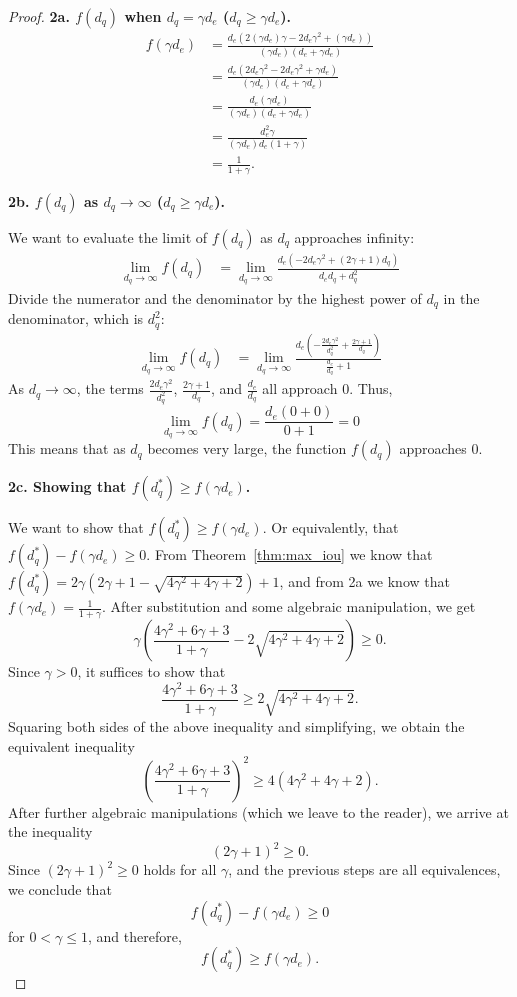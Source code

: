 \begin{proof}
\textbf{2a. $f(d_q)$ when $d_q = \gamma d_e$ ($d_q \ge \gamma d_e$).}
\begin{align*}
    f(\gamma d_e) &= \frac{d_{e} \left( 2 (\gamma d_e) \gamma - 2 d_{e} \gamma^{2} + (\gamma d_e)\right)}{(\gamma d_e) \left(d_{e} + \gamma d_e\right)} \\
    &= \frac{d_{e} \left( 2 d_e \gamma^2 - 2 d_{e} \gamma^{2} + \gamma d_e\right)}{(\gamma d_e) \left(d_{e} + \gamma d_e\right)} \\
    &= \frac{d_{e} \left(\gamma d_e\right)}{(\gamma d_e) \left(d_{e} + \gamma d_e\right)} \\
    &= \frac{d_{e}^2 \gamma}{(\gamma d_e) d_{e}(1+\gamma)} \\
    &= \frac{1}{1+\gamma}.
\end{align*}

\textbf{2b. $f(d_q)$ as $d_q \rightarrow \infty$ ($d_q \ge \gamma d_e$).}

We want to evaluate the limit of $f(d_q)$ as $d_q$ approaches infinity:
\begin{align*}
\lim_{d_q \rightarrow \infty} f(d_q) &= \lim_{d_q \rightarrow \infty} \frac{d_e (-2d_e \gamma^2 + (2\gamma + 1)d_q)}{d_e d_q + d_q^2}
\end{align*}
Divide the numerator and the denominator by the highest power of $d_q$ in the denominator, which is $d_q^2$:
\begin{align*}
\lim_{d_q \rightarrow \infty} f(d_q) &= \lim_{d_q \rightarrow \infty} \frac{d_e \left(-\frac{2d_e \gamma^2}{d_q^2} + \frac{2\gamma + 1}{d_q}\right)}{\frac{d_e}{d_q} + 1}
\end{align*}
As $d_q \rightarrow \infty$, the terms $\frac{2d_e \gamma^2}{d_q^2}$, $\frac{2\gamma + 1}{d_q}$, and $\frac{d_e}{d_q}$ all approach 0. Thus,
\begin{equation*}
\lim_{d_q \rightarrow \infty} f(d_q) = \frac{d_e (0 + 0)}{0 + 1} = 0
\end{equation*}
This means that as $d_q$ becomes very large, the function $f(d_q)$ approaches 0.

\textbf{2c. Showing that $f(d_q^*) \ge f(\gamma d_e)$.}

We want to show that $f(d^*_q) \ge f(\gamma d_e)$. Or equivalently, that $f(d^*_q) - f(\gamma d_e) \ge 0$. From Theorem~\ref{thm:max_iou} we know that $f(d^*_q) = 2\gamma\left(2\gamma + 1 - \sqrt{4\gamma^2 + 4\gamma + 2}\right) + 1$, and from 2a we know that $f(\gamma d_e) = \frac{1}{1+\gamma}$. After substitution and some algebraic manipulation, we get
$$\gamma\left(\frac{4\gamma^2+6\gamma+3}{1+\gamma} - 2\sqrt{4\gamma^2 + 4\gamma + 2}\right) \ge 0.$$
Since $\gamma > 0$, it suffices to show that 
$$\frac{4\gamma^2+6\gamma+3}{1+\gamma} \geq 2\sqrt{4\gamma^2 + 4\gamma + 2}.$$
Squaring both sides of the above inequality and simplifying, we obtain the equivalent inequality
$$\left(\frac{4\gamma^2+6\gamma+3}{1+\gamma}\right)^2 \geq 4(4\gamma^2 + 4\gamma + 2).$$
After further algebraic manipulations (which we leave to the reader), we arrive at the inequality
$$(2\gamma + 1)^2 \geq 0.$$
Since $(2\gamma + 1)^2 \geq 0$ holds for all $\gamma$, and the previous steps are all equivalences, we conclude that 
$$ f(d_q^*) - f(\gamma d_e) \ge 0$$ for $0<\gamma\le 1$, and therefore,
$$f(d^*_q) \ge f(\gamma d_e).$$


\end{proof}
